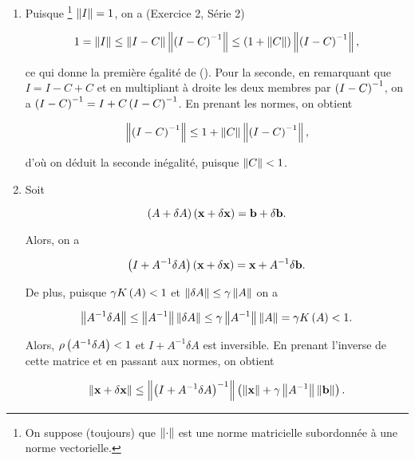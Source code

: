 \begin{enumerate}[label=\alph*)]
  \item Puisque \footnote{On suppose (toujours) que $\left\lVert\cdot\right\rVert$ est une norme matricielle subordonnée à une norme vectorielle.} $\left\lVert I\right\rVert = 1$, on a (Exercice 2, Série 2)
  
  \begin{equation*}
    1 = \left\lVert I\right\rVert
    \leq \left\lVert I - C\right\rVert \left\lVert\left(I - C\right)^{-1}\right\rVert
    \leq \left(1 + \left\lVert C\right\rVert\right) \left\lVert\left(I - C\right)^{-1}\right\rVert,
  \end{equation*}
  
  ce qui donne la première égalité de ().
  Pour la seconde, en remarquant que $I = I - C + C$ et en multipliant à droite les deux membres par $\left(I - C\right)^{-1}$, on a $\left(I - C\right)^{-1} = I + C \left(I - C\right)^{-1}$.
  En prenant les normes, on obtient
  
  \begin{equation*}
    \left\lVert\left(I - C\right)^{-1}\right\rVert \leq 1 + \left\lVert C\right\rVert \left\lVert\left(I - C\right)^{-1}\right\rVert,
  \end{equation*}
  
  d'où on déduit la seconde inégalité, puisque $\left\lVert C\right\rVert < 1$.
  
  \item Soit
  
  \begin{equation*}
    \left(A + \delta A\right) \left(\mathbf{x} + \delta \mathbf{x}\right) = \mathbf{b} + \delta \mathbf{b}.
  \end{equation*}
  
  Alors, on a
  
  \begin{equation*}
    \left(I + A^{-1} \delta A\right) \left(\mathbf{x} + \delta \mathbf{x}\right) = \mathbf{x} + A^{-1} \delta \mathbf{b}.
  \end{equation*}
  
  De plus, puisque $\gamma K \left(A\right) < 1$ et $\left\lVert\delta A\right\rVert \leq \gamma \left\lVert A\right\rVert$ on a 
  
  \begin{equation*}
    \left\lVert A^{-1} \delta A\right\rVert
    \leq \left\lVert A^{-1}\right\rVert \left\lVert\delta A\right\rVert
    \leq \gamma \left\lVert A^{-1}\right\rVert \left\lVert A\right\rVert
    = \gamma K \left(A\right) < 1.
  \end{equation*}
  
  Alors, $\rho \left(A^{-1} \delta A\right) < 1$ et $I + A^{-1} \delta A$ est inversible.
  En prenant l'inverse de cette matrice et en passant aux normes, on obtient
  
  \begin{equation*}
    \left\lVert\mathbf{x} + \delta \mathbf{x}\right\rVert
    \leq \left\lVert\left(I + A^{-1} \delta A\right)^{-1}\right\rVert \left(\left\lVert\mathbf{x}\right\rVert + \gamma \left\lVert A^{-1}\right\rVert \left\lVert\mathbf{b}\right\rVert\right).
  \end{equation*}
  

\end{enumerate}
